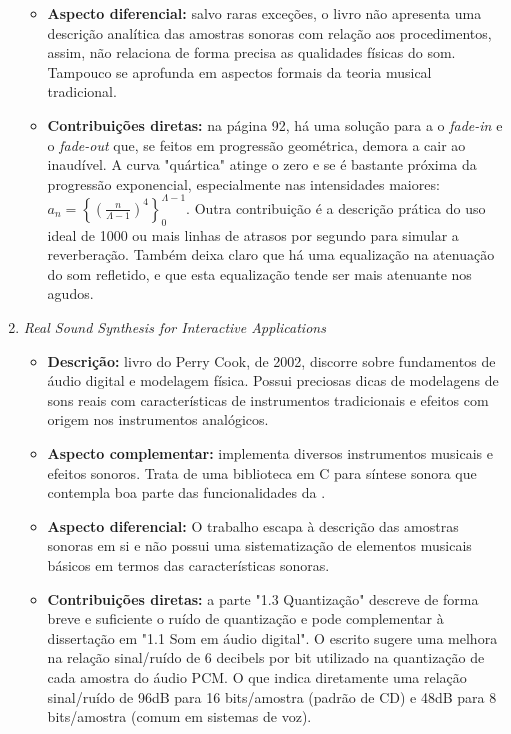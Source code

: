 \begin{enumerate}
\begin{itemize}
            \item {\bf Aspecto diferencial:} salvo raras exceções, o livro não apresenta uma descrição analítica das amostras sonoras com relação aos procedimentos, assim, não relaciona de forma precisa as qualidades físicas do som. Tampouco se aprofunda em aspectos formais da teoria musical tradicional.
            \item {\bf Contribuições diretas:} na página 92, há uma solução para a o \emph{fade-in} e o \emph{fade-out} que, se feitos em progressão geométrica, demora a cair ao inaudível. A curva "quártica" atinge o zero e se é bastante próxima da progressão exponencial, especialmente nas intensidades maiores: $a_n = \left\{\left(\frac{n}{\Lambda-1}\right)^4\right\}_0^{\Lambda-1}$. Outra contribuição é a descrição prática do uso ideal de 1000 ou mais linhas de atrasos por segundo para simular a reverberação. Também deixa claro que há uma equalização na atenuação do som refletido, e que esta equalização tende ser mais atenuante nos agudos.
        \end{itemize}
    \item \emph{Real Sound Synthesis for Interactive Applications}
        \begin{itemize}
            \item {\bf Descrição:} livro do Perry Cook, de 2002, discorre sobre fundamentos de áudio digital e modelagem física. Possui preciosas dicas de modelagens de sons reais com características de instrumentos tradicionais e efeitos com origem nos instrumentos analógicos.
            \item {\bf Aspecto complementar:} implementa diversos instrumentos musicais e efeitos sonoros. Trata de uma biblioteca em C para síntese sonora que contempla boa parte das funcionalidades da \massa.
            \item {\bf Aspecto diferencial:} O trabalho escapa à descrição das amostras sonoras em si e não possui uma sistematização de elementos musicais básicos em termos das características sonoras.
            \item {\bf Contribuições diretas:}  a parte "1.3 Quantização" descreve de forma breve e suficiente o ruído de quantização e pode complementar à dissertação em "1.1 Som em áudio digital". O escrito sugere uma melhora na relação sinal/ruído de 6 decibels por bit utilizado na quantização de cada amostra do áudio PCM. O que indica diretamente uma relação sinal/ruído de 96dB para 16 bits/amostra (padrão de CD) e 48dB para 8 bits/amostra (comum em sistemas de voz).
        \end{itemize}

\end{enumerate}
